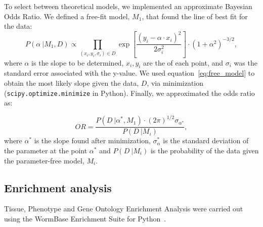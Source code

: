 \documentclass[9pt,twocolumn,twoside,lineno]{pnas-new}
\begin{document}
{To select between theoretical models, we implemented an approximate Bayesian
Odds Ratio. We defined a free-fit model, $M_1$, that found the line of best fit
for the data:
\begin{equation}
  P(\alpha~|M_1, D) \propto \prod_{(x_i, y_i, \sigma_i)\in D}
  \exp{
       [\frac{{(y_i - \alpha\cdot x_i)}^2} %
            {2\sigma_i^2}] %
      } \cdot {(1+\alpha^2)}^{-3/2},
  \label{eq:free_model}
\end{equation}
where $\alpha$ is the slope to be determined, $x_i, y_i$ are the
of each point, and $\sigma_i$ was the standard
error associated with the y-value. We used equation~\ref{eq:free_model} to
obtain the most likely slope given the data, $D$, via minimization
(\texttt{scipy.optimize.minimize} in Python). Finally, we approximated the odds
ratio as:

\begin{equation}
  OR = \frac{
  P(D~|\alpha^*, M_1)\cdot {(2\pi)}^{1/2}\sigma_{\alpha^*} %
  }{P(D~| M_i)}, %
\end{equation}
where $\alpha^*$ is the slope found after minimization, $\sigma_\alpha^*$ is the
standard deviation of the parameter at the point $\alpha^*$ and $P(D~|M_i)$ is
the probability of the data given the parameter-free model, $M_i$.

\subsection*{Enrichment analysis}
Tissue, Phenotype and Gene Ontology Enrichment Analysis were carried out using
the WormBase Enrichment Suite for Python~\cite{Angeles-Albores106369,
Angeles-Albores2016}.

} %

\showmatmethods{} %


\showacknow{} %



\end{document}
